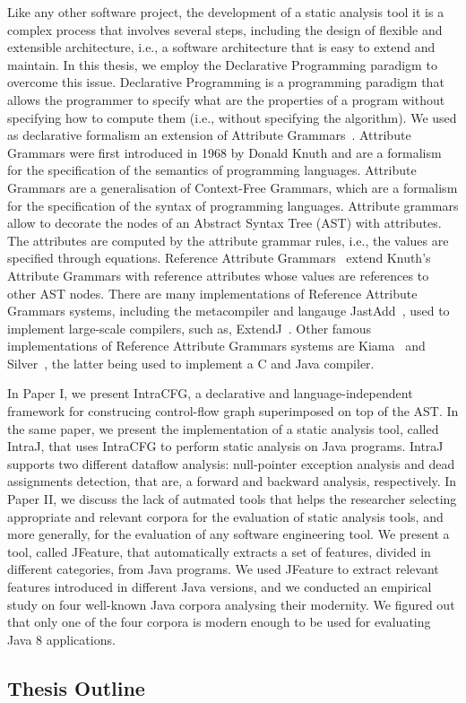 Like any other software project, the development of a static analysis tool
it is a complex process that involves several steps, including the design of 
flexible and extensible architecture, i.e., a software architecture that is 
easy to extend and maintain. In this thesis, we employ the Declarative Programming
paradigm to overcome this issue. Declarative Programming is a programming 
paradigm that allows the programmer to specify what are the properties of a
program without specifying how to compute them (i.e., without specifying the 
algorithm). We used as declarative formalism an extension of Attribute Grammars~\cite{knuth1968semantics}. Attribute Grammars
were first introduced in 1968 by Donald Knuth and are a formalism for the specification
of the semantics of programming languages. Attribute Grammars are a generalisation
of Context-Free Grammars, which are a formalism for the specification of the syntax
of programming languages. 
Attribute grammars allow to decorate the nodes of an Abstract Syntax Tree (AST) with attributes. 
The attributes are computed by the attribute grammar rules, i.e., the values are specified
through equations. Reference Attribute Grammars~\cite{hedin2000rags} extend Knuth's Attribute Grammars
with reference attributes whose values are references to other AST nodes. 
There are many implementations of Reference Attribute Grammars systems, including
the metacompiler and langauge JastAdd~\cite{ekman2007jastadd}, used to implement large-scale compilers, such as,
ExtendJ~\cite{DBLP:conf/oopsla/EkmanH07}.
Other famous implementations of Reference Attribute Grammars systems are Kiama~\cite{SLOANE2010205} and Silver~\cite{VANWYK201039}, 
the latter being used to implement a C and Java compiler.

In Paper I, we present IntraCFG, a declarative and language-independent framework for 
construcing control-flow graph superimposed on top of the AST. In the same paper, we
present the implementation of a static analysis tool, called IntraJ, that uses IntraCFG
to perform static analysis on Java programs. IntraJ supports two different dataflow analysis:
null-pointer exception analysis and dead assignments detection, that are, a forward and 
backward analysis, respectively. 
In Paper II, we discuss the lack of autmated tools that helps the researcher 
selecting appropriate and relevant corpora for the evaluation of static analysis tools, and more
generally, for the evaluation of any software engineering tool. We present a tool, called
JFeature, that automatically extracts a set of features, divided in different categories,
from Java programs. We used JFeature to extract relevant features introduced in different 
Java versions, and we conducted an empirical study on four well-known Java corpora analysing 
their modernity. We figured out that only one of the four corpora is modern enough to be used
for evaluating Java 8 applications.

 \subsection{Thesis Outline}








